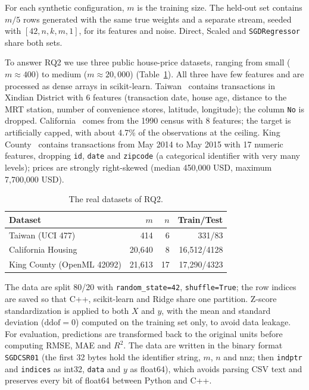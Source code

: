 \documentclass[10pt,a4paper,twocolumn]{article}
\newcommand{\sk}{\texttt{SGDRegressor}}
\begin{document}
For each synthetic configuration, $m$ is the training size. The held-out set contains $m/5$ rows generated with the same true weights and a separate stream, seeded with $[42,n,k,m,1]$, for its features and noise. Direct, Scaled and \sk{} share both sets.

To answer RQ2 we use three public house-price datasets, ranging from small ($m\approx400$) to medium ($m\approx20{,}000$) (Table~\ref{tab:real}). All three have few features and are processed as dense arrays in scikit-learn. Taiwan~\cite{yeh} contains transactions in Xindian District with 6 features (transaction date, house age, distance to the MRT station, number of convenience stores, latitude, longitude); the column \texttt{No} is dropped. California~\cite{pace} comes from the 1990 census with 8 features; the target is artificially capped, with about 4.7\% of the observations at the ceiling. King County~\cite{openml} contains transactions from May 2014 to May 2015 with 17 numeric features, dropping \texttt{id}, \texttt{date} and \texttt{zipcode} (a categorical identifier with very many levels); prices are strongly right-skewed (median 450,000 USD, maximum 7,700,000 USD).

\begin{table}[!htb]
\centering\footnotesize
\caption{The real datasets of RQ2.}\label{tab:real}
\begin{tabular}{@{}lrrr@{}}
\toprule
Dataset & $m$ & $n$ & Train/Test\\
\midrule
Taiwan (UCI 477) & 414 & 6 & 331/83\\
California Housing & 20,640 & 8 & 16,512/4128\\
King County (OpenML 42092) & 21,613 & 17 & 17,290/4323\\
\bottomrule
\end{tabular}
\end{table}

The data are split 80/20 with \texttt{random\_state=42}, \texttt{shuffle=True}; the row indices are saved so that C++, scikit-learn and Ridge share one partition. Z-score standardization is applied to both $X$ and $y$, with the mean and standard deviation ($\mathrm{ddof}=0$) computed on the training set only, to avoid data leakage. For evaluation, predictions are transformed back to the original units before computing RMSE, MAE and $R^2$. The data are written in the binary format \texttt{SGDCSR01} (the first 32 bytes hold the identifier string, $m$, $n$ and nnz; then \texttt{indptr} and \texttt{indices} as int32, \texttt{data} and $y$ as float64), which avoids parsing CSV text and preserves every bit of float64 between Python and C++.
\end{document}
